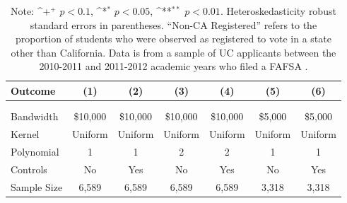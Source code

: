 \documentclass[12pt,letterpaper,oneside]{book}
\newcommand{\basepath}{g:/My Drive/Grad School}
\newcommand{\basepath}{basepath}
\begin{document}
    \begin{table}[h!]\centering
    \def\sym#1{\ifmmode^{#1}\else\(^{#1}\)\fi}
    \caption{Estimated Impacts of 2010-2011 Cal Grants on Out-of-State Registration\label{tab:extension}}
    \begin{tabular}{l*{6}{c}}
        \hline\hline
        Outcome&\multicolumn{1}{c}{(1)}&\multicolumn{1}{c}{(2)}&\multicolumn{1}{c}{(3)}&\multicolumn{1}{c}{(4)}&\multicolumn{1}{c}{(5)}&\multicolumn{1}{c}{(6)}\\
        \hline
        &&&&&&\\

        


        &&&&&&\\

        \hline
        Bandwidth & \$10,000       &   \$10,000        &   \$10,000        &   \$10,000       &   \$5,000        &   \$5,000        \\
        Kernel&   Uniform      &   Uniform        &   Uniform        &   Uniform       &   Uniform       &   Uniform       \\
        Polynomial&   1       &   1        &   2        &   2       &   1       &   1       \\
        Controls&   No       &   Yes        &   No        &   Yes        &   No        &   Yes        \\
        Sample Size      &      6,589     &      6,589      &   6,589    &   6,589       &   3,318     &    3,318      \\
        \hline
    \end{tabular}
    \caption*{\footnotesize Note: \sym{+} \(p<0.1\), \sym{*} \(p<0.05\), \sym{**} \(p<0.01\). Heteroskedasticity robust standard errors in parentheses.    ``Non-CA Registered'' refers to the proportion of students who were observed as registered to vote in a state other than California. Data is from a sample of UC applicants between the 2010-2011 and 2011-2012 academic years who filed a FAFSA \citep{firoozi_effect_2023}. }
\end{table}

\clearpage
\end{document}
